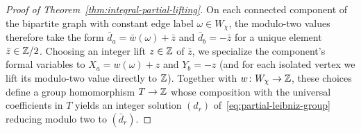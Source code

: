 \begin{proof}[Proof of Theorem~\ref{thm:integral-partial-lifting}]
On each connected component of the bipartite graph with constant edge label $\omega\in W_\chi$, the modulo-two values therefore take the form $\bar d_a=\bar w(\omega)+\bar z$ and $\bar d_b=-\bar z$ for a unique element $\bar z\in\mathbb Z/2$. Choosing an integer lift $z\in\mathbb Z$ of $\bar z$, we specialize the component's formal variables to $X_a=w(\omega)+z$ and $Y_b=-z$ (and for each isolated vertex we lift its modulo-two value directly to $\mathbb Z$). Together with $w\colon W_\chi\to\mathbb Z$, these choices define a group homomorphism $T\to\mathbb Z$ whose composition with the universal coefficients in $T$ yields an integer solution $(d_r)$ of~\eqref{eq:partial-leibniz-group} reducing modulo two to $(\bar d_r)$.
\end{proof}
